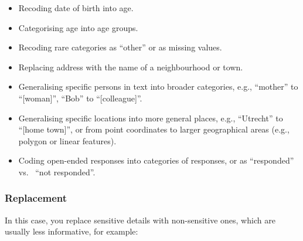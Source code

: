 \documentclass[
]{book}
\providecommand{\tightlist}{%
  \setlength{\itemsep}{0pt}\setlength{\parskip}{0pt}}
\begin{document}
\begin{itemize}
\tightlist
\item
  Recoding date of birth into age.
\item
  Categorising age into age groups.
\item
  Recoding rare categories as ``other'' or as missing values.
\item
  Replacing address with the name of a neighbourhood or town.
\item
  Generalising specific persons in text into broader categories, e.g., ``mother''
  to ``{[}woman{]}'', ``Bob'' to ``{[}colleague{]}''.
\item
  Generalising specific locations into more general places, e.g., ``Utrecht'' to
  ``{[}home town{]}'', or from point coordinates to larger geographical areas (e.g.,
  polygon or linear features).
\item
  Coding open-ended responses into categories of responses, or as ``responded'' vs.~
  ``not responded''.
\end{itemize}

\hypertarget{replacement}{%
\subsubsection{Replacement}\label{replacement}}

In this case, you replace sensitive details with non-sensitive ones, which are
usually less informative, for example:
\end{document}
